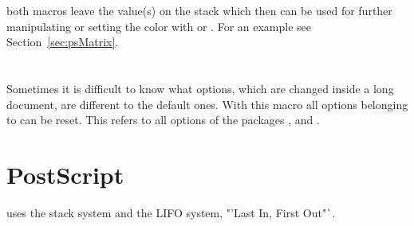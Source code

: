 \documentclass[11pt,english,BCOR10mm,DIV12,bibliography=totoc,parskip=false,smallheadings
    headexclude,footexclude,oneside]{pst-doc}
\begin{document}
both macros leave the value(s) on the stack which then can be used for further
manipulating or setting the color with  or . 
For an example see Section~\ref{sec:psMatrix}.

\appendix


\clearpage
\section{}

Sometimes it is difficult to know what options, which are changed
inside a long document, are different to the default ones. With
this macro all options belonging to  can be reset.
This refers to all options of the packages ,
 and .



\section{PostScript}

 uses the stack system and the LIFO system, "'Last In, First Out"`.
\end{document}
